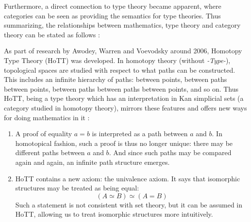 Furthermore, a direct connection to type theory became apparent, where
categories can be seen as providing the semantics for type theories.
Thus summarizing, the relationships between mathematics, type theory and category theory can be
stated as follows \citep{Trinity}:

\begin{center}
\end{center}

As part of research by Awodey, Warren and Voevodsky around 2006, Homotopy Type
Theory (HoTT) was developed. In homotopy theory (without \textit{-Type-}), topological spaces are studied
with respect to what paths can be constructed. This includes an infinite
hierarchy of paths: between points, between paths between points, between paths
between paths between points, and so on. Thus HoTT, being a type theory which has an
interpretation in Kan simplicial sets (a category studied in homotopy
theory), mirrors these features and offers new ways for doing mathematics in
it \citep{HoTTBook}:
\begin{enumerate}
\item A proof of equality $a = b$ is interpreted as a path between $a$ and $b$.
  In homotopical fashion, such a proof is thus no longer unique: there may be
  different paths between $a$ and $b$. And since such paths may be compared
  again and again, an infinite path structure emerges.
\item HoTT contains a new axiom: the univalence axiom. It says that 
  isomorphic structures may be treated as being equal:
  \[
    (A \simeq B) \simeq (A = B)
  \]
  Such a statement is not consistent with set theory, but it can be assumed in HoTT,
  allowing us to treat isomorphic structures more intuitively. 
\end{enumerate}

